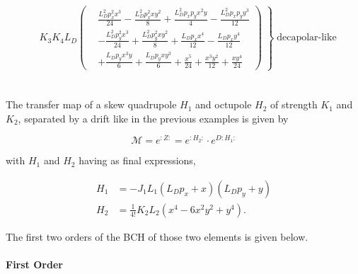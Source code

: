 \footnotesize
\begin{equation}
  \begin{aligned}
    &K_{3} K_{4} L_{D} \left.\left(
    \begin{aligned}
      &\frac{L_{D}^{2} p_{x}^{2} x^{3}}{24} - \frac{L_{D}^{2} p_{x}^{2} x y^{2}}{8} + \frac{L_{D}^{2} p_{x} p_{y} x^{2} y}{4} - \frac{L_{D}^{2} p_{x} p_{y} y^{3}}{12} \\
      &- \frac{L_{D}^{2} p_{y}^{2} x^{3}}{24} + \frac{L_{D}^{2} p_{y}^{2} x y^{2}}{8} + \frac{L_{D} p_{x} x^{4}}{12} - \frac{L_{D} p_{x} y^{4}}{12} \\
      &+ \frac{L_{D} p_{y} x^{3} y}{6} + \frac{L_{D} p_{y} x y^{3}}{6} + \frac{x^{5}}{24} + \frac{x^{3} y^{2}}{12} + \frac{x y^{4}}{24}
    \end{aligned} 
    \right) \;\right\} \; \text{decapolar-like}\\
  \end{aligned}
\end{equation}
\normalsize



\subsection{}
\label{appendix:transfer_map:skew_quadrupole_and_octupole}

The transfer map of a skew quadrupole $H_1$ and octupole $H_2$ of strength $K_1$ and $K_2$,
separated by a drift like in the previous examples is given by

\begin{equation}
  \mathcal{M} = e^{:Z:} = e^{:H_2:} \cdot e^{D:H_1:}
\end{equation}

with $H_1$ and $H_2$ having as final expressions,

\begin{equation}
  \begin{aligned}
    H_1 &= - J_{1} L_{1} \left(L_{D} p_{x} + x\right) \left(L_{D} p_{y} + y\right) \\
    H_2 &= \frac{1}{4!} K_{2} L_{2} \left(x^{4} - 6 x^{2} y^{2} + y^{4}\right).
  \end{aligned}
\end{equation}

The first two orders of the BCH of those two elements is given below.

\paragraph{First Order}

